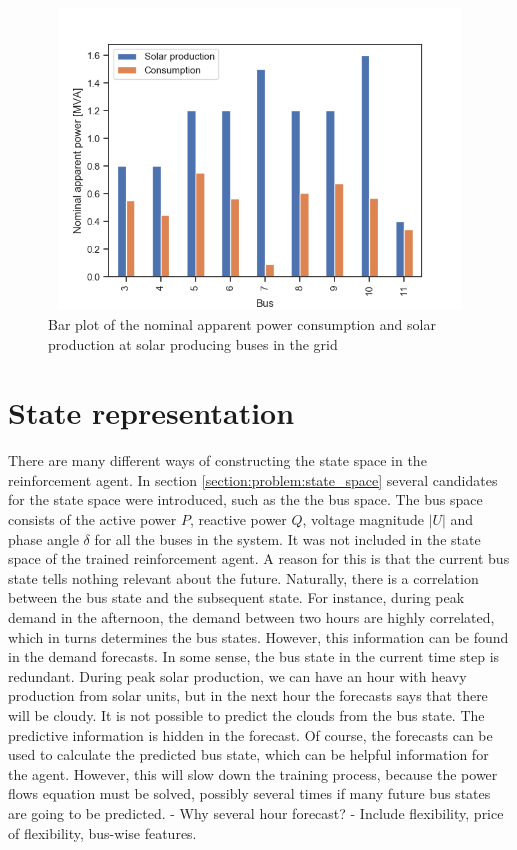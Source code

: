 \documentclass[class=book, crop=false]{standalone}
\begin{document}
\begin{figure}[h]
    \center
\includegraphics[height=8cm, width=12cm]{figures/nominal_sgen.png}
    \caption[size = 9]{Bar plot of the nominal apparent power consumption and solar production at solar producing buses in the grid}
    \label{fig:discussion:nominal_sgen}
\end{figure}




\section{State representation}
There are many different ways of constructing the state space in the reinforcement agent. In section \ref{section:problem:state_space} several candidates for the state space were introduced, such as the the bus space. The bus space consists of the active power $P$, reactive power $Q$, voltage magnitude $|U|$ and phase angle $\delta$ for all the buses in the system. It was not included in the state space of the trained reinforcement agent. A reason for this is that the current bus state tells nothing relevant about the future. Naturally, there is a correlation between the bus state and the subsequent state. For instance, during peak demand in the afternoon, the demand between two hours are highly correlated, which in turns determines the bus states. However, this information can be found in the demand forecasts. In some sense, the bus state in the current time step is redundant. During peak solar production, we can have an hour with heavy production from solar units, but in the next hour the forecasts says that there will be cloudy. It is not possible to predict the clouds from the bus state. The predictive information is hidden in the forecast. Of course, the forecasts can be used to calculate the predicted bus state, which can be helpful information for the agent. However, this will slow down the training process, because the power flows equation must be solved, possibly several times if many future bus states are going to be predicted. 
- Why several hour forecast?
- Include flexibility, price of flexibility, bus-wise features. 
\end{document}
